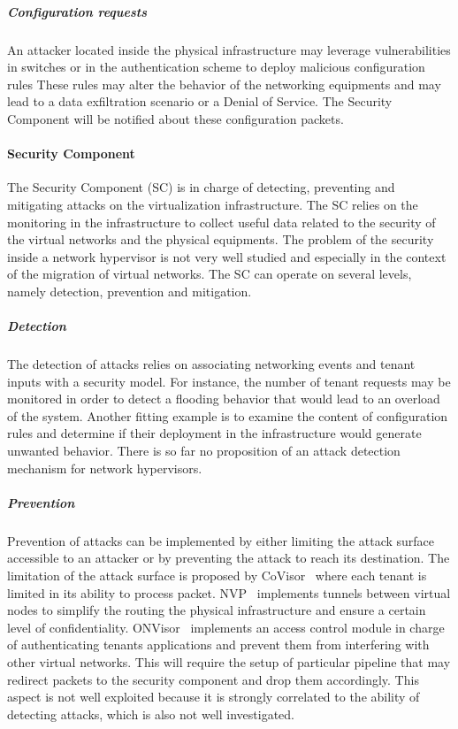 \subparagraph{Configuration requests} An attacker located inside the physical infrastructure may leverage vulnerabilities in switches or in the authentication scheme to deploy malicious configuration rules These rules may alter the behavior of the networking equipments and may lead to a data exfiltration scenario or a Denial of Service.
The Security Component will be notified about these configuration packets.

\paragraph{Security Component}
The Security Component (SC) is in charge of detecting, preventing and mitigating attacks on the virtualization infrastructure. The SC relies on the monitoring in the infrastructure to collect useful data related to the security of the virtual networks and the physical equipments.
The problem of the security inside a network hypervisor is not very well studied and especially in the context of the migration of virtual networks.
The SC can operate on several levels, namely detection, prevention and mitigation.

\subparagraph{Detection}
The detection of attacks relies on associating networking events and tenant inputs with a security model.
For instance, the number of tenant requests may be monitored in order to detect a flooding behavior that would lead to an overload of the system. Another fitting example is to examine the content of configuration rules and determine if their deployment in the infrastructure would generate unwanted behavior.
There is so far no proposition of an attack detection mechanism for network hypervisors.

\subparagraph{Prevention}
Prevention of attacks can be implemented by either limiting the attack surface accessible to an attacker or by preventing the attack to reach its destination. The limitation of the attack surface is proposed by CoVisor~\cite{CoVisor-Jin2015} where each tenant is limited in its ability to process packet.
NVP~\cite{NVP-Koponen2014} implements tunnels between virtual nodes to simplify the routing the physical infrastructure and ensure a certain level of confidentiality.
ONVisor~\cite{ONVisor-Han2018} implements an access control module in charge of authenticating tenants applications and prevent them from interfering with other virtual networks.
This will require the setup of particular pipeline that may redirect packets to the security component and drop them accordingly. This aspect is not well exploited because it is strongly correlated to the ability of detecting attacks, which is also not well investigated. 

